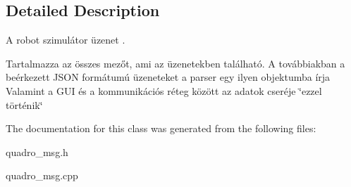 \subsection{Detailed Description}
A robot szimulátor üzenet . 

Tartalmazza az összes mezőt, ami az üzenetekben található. A továbbiakban a beérkezett J\-S\-O\-N formátumú üzeneteket a parser egy ilyen objektumba írja Valamint a G\-U\-I és a kommunikációs réteg között az adatok cseréje \char`\"{}ezzel történik\char`\"{} 

The documentation for this class was generated from the following files\-:\begin{DoxyCompactItemize}
\item 
quadro\-\_\-msg.\-h\item 
quadro\-\_\-msg.\-cpp\end{DoxyCompactItemize}
